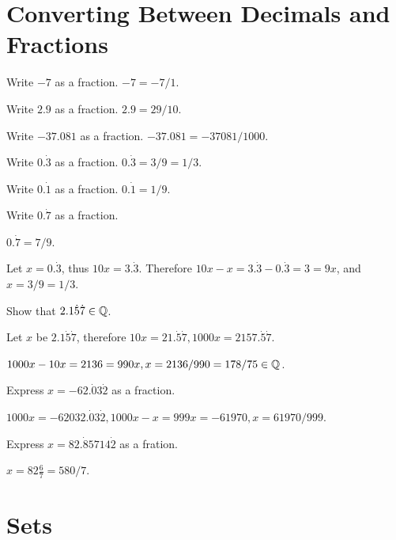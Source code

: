 \documentclass[8pt]{article}
\author{\Author}
\title{\Title}
\date{\Date}
\begin{document}
	\maketitle

	\tableofcontents

	\section{Converting Between Decimals and Fractions}

		\exmp Write \(-7\) as a fraction. \(-7 = -7 / 1\).

		\exmp Write \(2.9\) as a fraction. \(2.9 = 29/10\).

		\exmp Write \(-37.081\) as a fraction. \(-37.081 = -37081/1000\).

		\exmp Write \(0.\dot{3}\) as a fraction. \(0.\dot{3} = 3 / 9 = 1 / 3\).

		\exmp Write \(0.\dot{1}\) as a fraction. \(0.\dot{1} = 1 / 9\).\newline

		\prob Write \(0.\dot{7}\) as a fraction.
		
		\solution \(0.\dot{7} = 7 / 9\).\newline

		\meth {} Let \(x = 0.\dot{3}\), thus \(10x = 3.\dot{3}\). Therefore \(10x - x = 3.\dot{3} - 0.\dot{3} = 3 = 9x\), and \(x = 3/9 = 1/3\).\newline

		\prob Show that \(2.1\dot{5}\dot{7} \in \mathbb{Q}\).
		
		\solution Let \(x\) be \( 2.1 \dot{5} \dot{7}\), therefore \(10x = 21.\dot{5}\dot{7}, 1000x = 2157.\dot{5}\dot{7}\).
		
		\(1000x - 10x = 2136 = 990x, x = 2136/990 = 178/75 \in \mathbb{Q}\).\newline

		\prob Express \(x = -62.\dot{0}3\dot{2}\) as a fraction.
		
		\solution \(1000x = -62032.\dot{0}3\dot{2}, 1000x - x = 999 x = -61970, x = 61970 / 999\). \newline

		\prob Express \(x = 82.\dot{8}5714\dot{2}\) as a fration.
		
		\solution \(x = 82\frac{6}{7} = 580/7\).

	\section{Sets}
\end{document}
